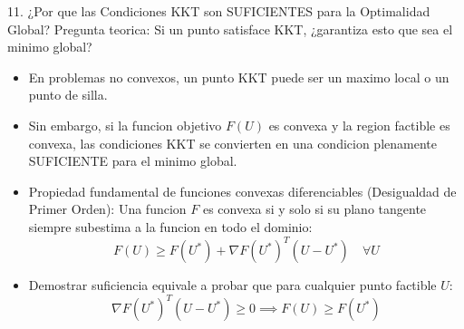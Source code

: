 \documentclass[aspectratio=169,10pt]{beamer}
\begin{document}
\begin{frame}{11. ¿Por que las Condiciones KKT son SUFICIENTES para la Optimalidad Global?}
  Pregunta teorica: Si un punto satisface KKT, ¿garantiza esto que sea el minimo global?
  \vspace{0.2cm}
  \begin{itemize}
    \item En problemas no convexos, un punto KKT puede ser un maximo local o un punto de silla.
    \vspace{0.2cm}
    \item Sin embargo, si la funcion objetivo $F(U)$ es convexa y la region factible es convexa, las condiciones KKT se convierten en una condicion plenamente SUFICIENTE para el minimo global.
    \vspace{0.2cm}
    \item Propiedad fundamental de funciones convexas diferenciables (Desigualdad de Primer Orden):
    Una funcion $F$ es convexa si y solo si su plano tangente siempre subestima a la funcion en todo el dominio:
    \begin{equation*}
      F(U) \ge F(U^*) + \nabla F(U^*)^T (U - U^*) \quad \forall U
    \end{equation*}
    \item Demostrar suficiencia equivale a probar que para cualquier punto factible $U$:
    \begin{equation*}
      \nabla F(U^*)^T (U - U^*) \ge 0 \implies F(U) \ge F(U^*)
    \end{equation*}
  \end{itemize}
\end{frame}
\end{document}
